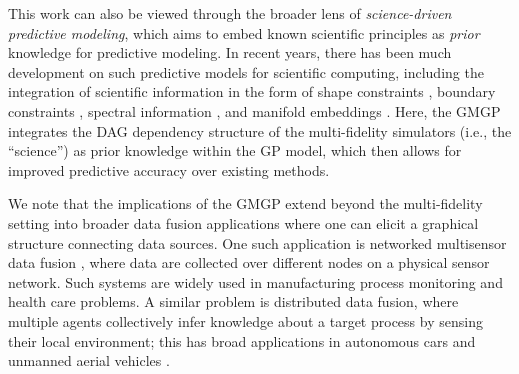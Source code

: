 \documentclass[12pt]{article}
\begin{document}


This work can also be viewed through the broader lens of \textit{science-driven predictive modeling}, which aims to embed known scientific principles as \textit{prior} knowledge for predictive modeling. In recent years, there has been much development on such predictive models for scientific computing, including the integration of scientific information in the form of shape constraints \citep{golchi2015monotone,wang2016estimating}, boundary constraints \citep{ding2019bdrygp}, spectral information \citep{chen2020function}, and manifold embeddings \citep{zhang2021gaussian}. Here, the GMGP integrates the DAG dependency structure of the multi-fidelity simulators (i.e., the ``science'') as prior knowledge within the GP model, which then allows for improved predictive accuracy over existing methods.

We note that the implications of the GMGP extend beyond the multi-fidelity setting into broader data fusion applications where one can elicit a graphical structure connecting data sources. One such application is networked multisensor data fusion \citep{xia2009networked}, where data are collected over different nodes on a physical sensor network. Such systems are widely used in manufacturing process monitoring and health care problems. A similar problem is distributed data fusion, where multiple agents collectively infer knowledge about a target process by sensing their local environment; this has broad applications in autonomous cars and unmanned aerial vehicles \citep{campbell2016distributed}.
\end{document}
